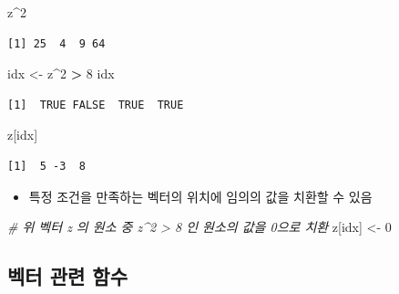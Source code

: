 \documentclass[
  11pt,
]{krantz}
\newenvironment{Shaded}{\begin{snugshade}}{\end{snugshade}}
\newcommand{\CommentTok}[1]{\textcolor[rgb]{0.37,0.37,0.37}{\textit{#1}}}
\newcommand{\DecValTok}[1]{\textcolor[rgb]{0.06,0.06,0.06}{#1}}
\newcommand{\NormalTok}[1]{#1}
\newcommand{\OperatorTok}[1]{\textcolor[rgb]{0.43,0.43,0.43}{\textbf{#1}}}
\newcommand{\StringTok}[1]{\textcolor[rgb]{0.5,0.5,0.5}{#1}}
\providecommand{\tightlist}{%
  \setlength{\itemsep}{0pt}\setlength{\parskip}{0pt}}
\begin{document}
\footnotesize

\begin{Shaded}
\begin{Highlighting}[]
\NormalTok{z}\OperatorTok{^}\DecValTok{2}
\end{Highlighting}
\end{Shaded}

\begin{verbatim}
[1] 25  4  9 64
\end{verbatim}

\begin{Shaded}
\begin{Highlighting}[]
\NormalTok{idx <-}\StringTok{ }\NormalTok{z}\OperatorTok{^}\DecValTok{2} \OperatorTok{>}\StringTok{ }\DecValTok{8}
\NormalTok{idx}
\end{Highlighting}
\end{Shaded}

\begin{verbatim}
[1]  TRUE FALSE  TRUE  TRUE
\end{verbatim}

\begin{Shaded}
\begin{Highlighting}[]
\NormalTok{z[idx]}
\end{Highlighting}
\end{Shaded}

\begin{verbatim}
[1]  5 -3  8
\end{verbatim}

\normalsize

\begin{itemize}
\tightlist
\item
  특정 조건을 만족하는 벡터의 위치에 임의의 값을 치환할 수 있음
\end{itemize}

\footnotesize

\begin{Shaded}
\begin{Highlighting}[]
\CommentTok{# 위 벡터 z 의 원소 중 z^2 > 8 인 원소의 값을 0으로 치환}
\NormalTok{z[idx] <-}\StringTok{ }\DecValTok{0}
\end{Highlighting}
\end{Shaded}

\normalsize

\hypertarget{vector-function}{%
\subsection{벡터 관련 함수}\label{vector-function}}
\end{document}
